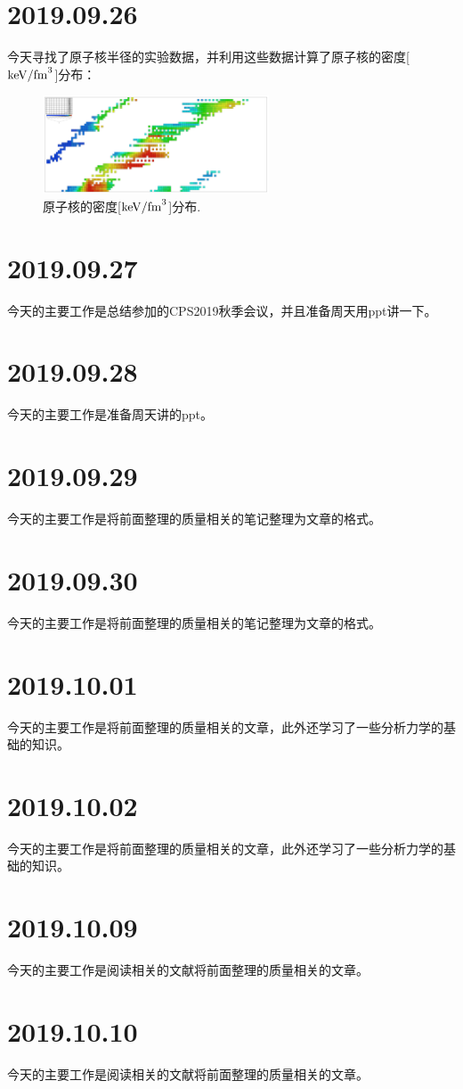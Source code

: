 \section{2019.09.26}
今天寻找了原子核半径的实验数据，并利用这些数据计算了原子核的密度[${\rm keV/fm}^3$]分布：
\begin{figure}[H]
\centering
\includegraphics[width=0.6\textwidth]{figure/density.pdf}
\caption{原子核的密度[${\rm keV/fm}^3$]分布.\label{fig_density}}
\end{figure}

\section{2019.09.27}
今天的主要工作是总结参加的CPS2019秋季会议，并且准备周天用ppt讲一下。

\section{2019.09.28}
今天的主要工作是准备周天讲的ppt。

\section{2019.09.29}
今天的主要工作是将前面整理的质量相关的笔记整理为文章的格式。

\section{2019.09.30}
今天的主要工作是将前面整理的质量相关的笔记整理为文章的格式。

\section{2019.10.01}
今天的主要工作是将前面整理的质量相关的文章，此外还学习了一些分析力学的基础的知识。

\section{2019.10.02}
今天的主要工作是将前面整理的质量相关的文章，此外还学习了一些分析力学的基础的知识。

\section{2019.10.09}
今天的主要工作是阅读相关的文献将前面整理的质量相关的文章。

\section{2019.10.10}
今天的主要工作是阅读相关的文献将前面整理的质量相关的文章。